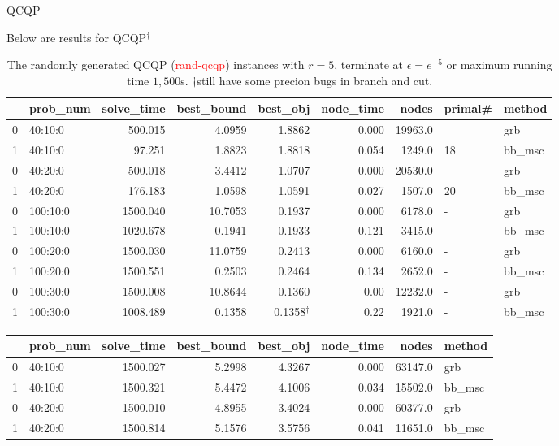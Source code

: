 \documentclass[aspectratio=1610, 9pt]{beamer}
\newcommand{\redsf}[1]{\textcolor{red}{\textsf{#1}}}
\begin{document}
\begin{frame}[standout]{QCQP}

  Below are results for QCQP\(^\dagger\)

  \small
  \begin{table}[h!]
    \centering
    \begin{tabular}{llrrrrrll}
      \toprule
      {} & prob\_num & solve\_time & best\_bound & best\_obj          & node\_time & nodes   & primal\# & method  \\
      \midrule
      0  & 40:10:0   & 500.015     & 4.0959      & 1.8862             & 0.000      & 19963.0 &          & grb     \\
      1  & 40:10:0   & 97.251      & 1.8823      & 1.8818             & 0.054      & 1249.0  & 18       & bb\_msc \\
      0  & 40:20:0   & 500.018     & 3.4412      & 1.0707             & 0.000      & 20530.0 &          & grb     \\
      1  & 40:20:0   & 176.183     & 1.0598      & 1.0591             & 0.027      & 1507.0  & 20       & bb\_msc \\
      0  & 100:10:0  & 1500.040    & 10.7053     & 0.1937             & 0.000      & 6178.0  & -        & grb     \\
      1  & 100:10:0  & 1020.678    & 0.1941      & 0.1933             & 0.121      & 3415.0  & -        & bb\_msc \\
      0  & 100:20:0  & 1500.030    & 11.0759     & 0.2413             & 0.000      & 6160.0  & -        & grb     \\
      1  & 100:20:0  & 1500.551    & 0.2503      & 0.2464             & 0.134      & 2652.0  & -        & bb\_msc \\
      0  & 100:30:0  & 1500.008    & 10.8644     & 0.1360             & 0.00       & 12232.0 & -        & grb     \\
      1  & 100:30:0  & 1008.489    & 0.1358      & 0.1358\(^\dagger\) & 0.22       & 1921.0  & -        & bb\_msc \\
      \bottomrule
    \end{tabular}
    \caption{The randomly generated QCQP (\redsf{rand-qcqp}) instances with \(r = 5\), terminate at \(\epsilon = e^{-5}\) or maximum running time \(1,500\)s. \(\dagger\){still have some precion bugs in branch and cut.}}
  \end{table}
  \begin{table}[h!]
    \begin{tabular}{llrrrrrl}
      \toprule
      {} & prob\_num & solve\_time & best\_bound & best\_obj & node\_time & nodes   & method  \\
      \midrule
      0  & 40:10:0   & 1500.027    & 5.2998      & 4.3267    & 0.000      & 63147.0 & grb     \\
      1  & 40:10:0   & 1500.321    & 5.4472      & 4.1006    & 0.034      & 15502.0 & bb\_msc \\
      0  & 40:20:0   & 1500.010    & 4.8955      & 3.4024    & 0.000      & 60377.0 & grb     \\
      1  & 40:20:0   & 1500.814    & 5.1576      & 3.5756    & 0.041      & 11651.0 & bb\_msc \\


\end{tabular}
\end{table}
\end{frame}
\end{document}
